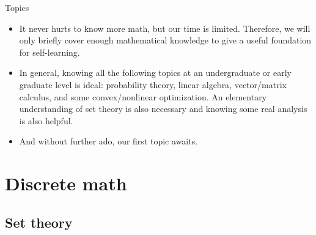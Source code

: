 \documentclass{beamer}
\begin{document}
\begin{frame}{Topics}
    \begin{itemize}
        \item
        It never hurts to know more math, but our time is limited. Therefore,
        we will only briefly cover enough mathematical knowledge to give a
        useful foundation for self-learning.

        \item
        In general, knowing all the following topics at an undergraduate or
        early graduate level is ideal: probability theory, linear algebra,
        vector/matrix calculus, and some convex/nonlinear optimization. An
        elementary understanding of set theory is also necessary and
        knowing some real analysis is also helpful.

        \item
        And without further ado, our first topic awaits.
    \end{itemize}
\end{frame}

\section{Discrete math}

\subsection{Set theory}
\end{document}
